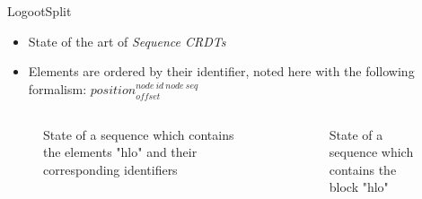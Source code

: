\documentclass[10pt]{beamer}
\newcommand{\trm}[1]{\mathit{#1}}
\newcommand{\id}[3]{$\trm{#1}^{\trm{#2}}_{\trm{#3}}$}
\newcommand{\widthletter}{7mm}
\begin{document}
\begin{frame}{LogootSplit }
  \begin{itemize}
    \item State of the art of \emph{Sequence \acp{CRDT}}
    \item Elements are ordered by their identifier, noted here with the following formalism: \id{position}{node~id~node~seq}{offset}
  \end{itemize}

  \pause

  \begin{columns}
    \begin{column}{0.5\textwidth}
      \begin{figure}
        \centering
        \caption{State of a sequence which contains the elements "hlo" and their corresponding identifiers}
      \end{figure}
    \end{column}
    \pause
    \begin{column}{0.5\textwidth}
      \vspace{-5mm}
      \begin{figure}
        \centering
        \caption{State of a sequence which contains the block "hlo"}
      \end{figure}
    \end{column}
  \end{columns}
\end{frame}
\end{document}
